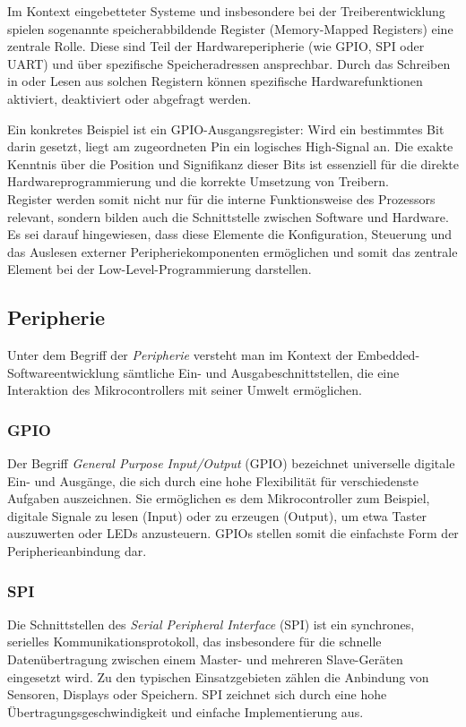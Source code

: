 Im Kontext eingebetteter Systeme und insbesondere bei der Treiberentwicklung spielen sogenannte speicherabbildende Register (Memory-Mapped Registers) eine zentrale Rolle. 
Diese sind Teil der Hardwareperipherie (wie GPIO, SPI oder UART) und über spezifische Speicheradressen ansprechbar. 
Durch das Schreiben in oder Lesen aus solchen Registern können spezifische Hardwarefunktionen aktiviert, deaktiviert oder abgefragt werden.

Ein konkretes Beispiel ist ein GPIO-Ausgangsregister: Wird ein bestimmtes Bit darin gesetzt, liegt am zugeordneten Pin ein logisches High-Signal an. 
Die exakte Kenntnis über die Position und Signifikanz dieser Bits ist essenziell für die direkte Hardwareprogrammierung und die korrekte Umsetzung von Treibern.
\\
Register werden somit nicht nur für die interne Funktionsweise des Prozessors relevant, sondern bilden auch die Schnittstelle zwischen Software und Hardware. Es sei darauf hingewiesen, dass diese Elemente die Konfiguration, Steuerung und das Auslesen externer Peripheriekomponenten ermöglichen und somit das zentrale Element bei der Low-Level-Programmierung darstellen.

\subsection*{Peripherie}
Unter dem Begriff der \emph{Peripherie} versteht man im Kontext der Embedded-Softwareentwicklung sämtliche Ein- und Ausgabeschnittstellen, die eine Interaktion des Mikrocontrollers mit seiner Umwelt ermöglichen.

\subsubsection*{GPIO}
Der Begriff \emph{General Purpose Input/Output} (GPIO) bezeichnet universelle digitale Ein- und Ausgänge, die sich durch eine hohe Flexibilität für verschiedenste Aufgaben auszeichnen.
Sie ermöglichen es dem Mikrocontroller zum Beispiel, digitale Signale zu lesen (Input) oder zu erzeugen (Output), um etwa Taster auszuwerten oder LEDs anzusteuern. 
GPIOs stellen somit die einfachste Form der Peripherieanbindung dar.

\subsubsection*{SPI}
Die Schnittstellen des \emph{Serial Peripheral Interface} (SPI) ist ein synchrones, serielles Kommunikationsprotokoll, das insbesondere für die schnelle Datenübertragung zwischen einem Master- und mehreren Slave-Geräten eingesetzt wird. 
Zu den typischen Einsatzgebieten zählen die Anbindung von Sensoren, Displays oder Speichern. 
SPI zeichnet sich durch eine hohe Übertragungsgeschwindigkeit und einfache Implementierung aus.

